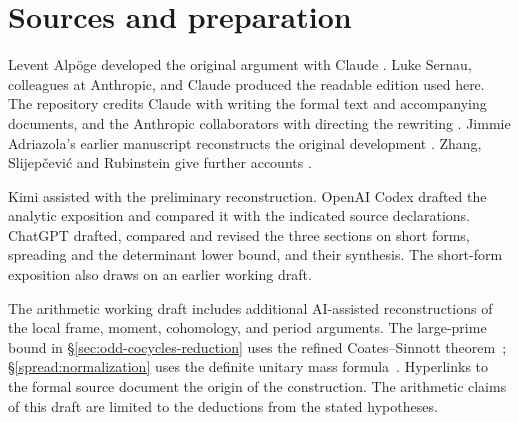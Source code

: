 \section*{Sources and preparation}
Levent Alp\"oge developed the original argument with Claude \cite{alpo}.
Luke Sernau, colleagues at Anthropic, and Claude produced the readable
edition used here. The repository credits Claude with writing the formal
text and accompanying documents, and the Anthropic collaborators with
directing the rewriting \cite{edition}. Jimmie Adriazola's earlier manuscript
reconstructs the original development \cite{ja}. Zhang, Slijep\v{c}evi\'c and
Rubinstein give further accounts \cite{zhang,slijepcevic,rubinstein}.

Kimi assisted with the preliminary reconstruction. OpenAI Codex drafted the
analytic exposition and compared it with the indicated source declarations.
ChatGPT drafted, compared and revised the three sections on short forms,
spreading and the determinant lower bound, and their synthesis. The
short-form exposition also draws on an earlier working draft.

The arithmetic working draft includes additional AI-assisted reconstructions of the
local frame, moment, cohomology, and period arguments. The large-prime bound
in \S\ref{sec:odd-cocycles-reduction} uses the refined Coates--Sinnott theorem~\cite{gp};
\S\ref{spread:normalization} uses the definite unitary mass formula~\cite{ghy}. Hyperlinks to
the formal source document the origin of the construction. The arithmetic
claims of this draft are limited to the deductions from the stated hypotheses.

\printbibliography[heading=bibintoc,title={References}]
